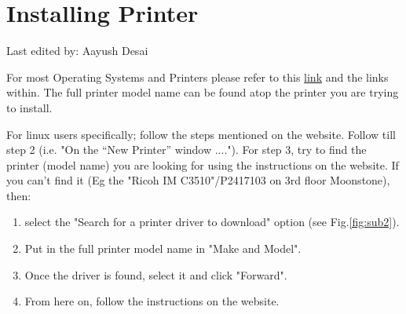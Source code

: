 \documentclass{article}
\newcommand{\setlasteditor}[1]{\gdef\lasteditor{#1}}
\newcommand{\lastedited}{%
    \vspace{1mm} {\footnotesize Last edited by: \lasteditor} \vspace{3mm}
    \newline

}
\begin{document}
\section{Installing Printer}
\setlasteditor{Aayush Desai}
\lastedited
\noindent
For most Operating Systems and Printers please refer to this \href{https://it.pages.ist.ac.at/docs/it-documentation/printing/}{link} and the links within. The full printer model name can be found atop the printer you are trying to install.

For linux users specifically; follow the steps mentioned on the website. 
Follow till step 2 (i.e. "On the “New Printer” window ....").
\newline
For step 3, try to find the printer (model name) you are looking for using the instructions on the website. If you can't find it (Eg the "Ricoh IM C3510"/P2417103 on 3rd floor Moonstone), then:

\begin{enumerate}
    \item select the "Search for a printer driver to download" option (see Fig.\ref{fig:sub2}). 
    \item Put in the full printer model name in "Make and Model".
    \item Once the driver is found, select it and click "Forward".
    \item From here on, follow the instructions on the website.
\end{enumerate} 
\end{document}
